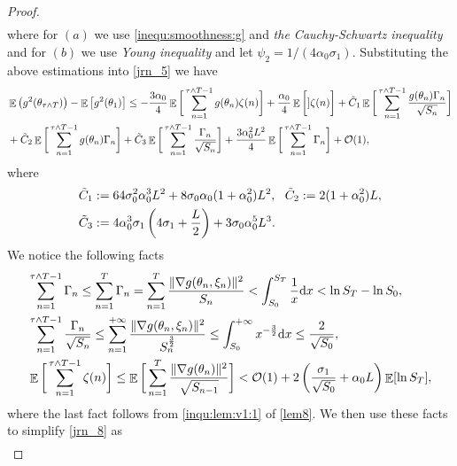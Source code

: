 \documentclass[standalone]{article}
\DeclareMathOperator{\Expect}{\mathbb{E}}
\begin{document}
\begin{proof}
\begin{equation}
\begin{aligned}
\end{aligned}\end{equation}
where for $(a)$ we use \cref{inequ:smoothness:g} and \emph{the Cauchy-Schwartz inequality} and for $(b)$ we use \emph{Young inequality} and let $\psi_2 = 1/(4\alpha_0\sigma_1)$. 
Substituting the above estimations into \cref{jrn_5} we have
\begin{align}\label{jrn_8}
&\Expect\big({g^{2}(\theta_{\tau\wedge T})}\big)-\Expect\big[{g^{2}(\theta_{1})}\big]\le- \frac{3\alpha_{0}}{4}\Expect\bigg[\sum_{n=1}^{\tau\wedge T-1}  g(\theta_{n}) \zeta(n)\bigg] +\frac{\alpha_{0}}{4}\Expect\bigg[] \zeta(n)\bigg] + \tilde{C}_1\Expect\bigg[\sum_{n=1}^{\tau\wedge T-1}\frac{g(\theta_{n})\Gamma_n}{\sqrt{S_{n}}}\bigg] \notag \\& +\tilde{C}_{2}\Expect\bigg[\sum_{n=1}^{\tau\wedge T-1} g(\theta_{n}) \Gamma_n\bigg] 
+\tilde{C}_3\Expect\bigg[\sum_{n=1}^{\tau\wedge T-1}\frac{\Gamma_n}{\sqrt{S_{n}}}\bigg]+\frac{3\alpha_{0}^2 L^2}{4}\Expect\bigg[\sum_{n=1}^{\tau\wedge T-1} \Gamma_n\bigg] + \mathcal{O}(1),
\end{align} where
\begin{align}
\tilde{C}_{1}&:=64\sigma_0^2\alpha_0^3 L^2 + 8\sigma_0\alpha_0(1+\alpha_0^2) L^2,\ \ \tilde{C}_{2}:= 2(1+\alpha_0^2) L,  \notag \\
\tilde{C}_{3} & :=4\alpha_0^3\sigma_1\left(4\sigma_1+\frac{ L}{2}\right)+3\sigma_0\alpha_{0}^{5} L^3. \notag 
\end{align}
We notice the following facts
\begin{align} 
&\sum_{n=1}^{\tau\wedge T-1} \Gamma_n \leq \sum_{n=1}^{T}\Gamma_n = \sum_{n=1}^{T}\frac{\|\nabla g(\theta_{n},\xi_{n})\|^{2}}{S_{n}}<\int_{S_{0}}^{S_{T}}\frac{1}{x}\text{d}x<\ln S_{T}-\ln S_{0}, \notag \\&
\sum_{n=1}^{\tau\wedge T-1}\frac{\Gamma_n}{\sqrt{S_n}}\le \sum_{n=1}^{+\infty}\frac{\|\nabla g(\theta_{n},\xi_{n})\|^{2}}{S_{n}^{\frac{3}{2}}}\le \int_{S_{0}}^{+\infty}x^{-\frac{3}{2}}\text{d}x\le \frac{2}{\sqrt{S_0}}, \notag \\& 
\Expect\bigg[\sum_{n=1}^{\tau\wedge T-1} \zeta(n)\bigg]\le \Expect\bigg[\sum_{n=1}^{T}\frac{\|\nabla g(\theta_{n})\|^{2}}{\sqrt{S_{n-1}}}\bigg]< \mathcal{O}(1)+ 2\left(\frac{\sigma_1}{\sqrt{S_0}} + \alpha_0 L\right)\Expect[\ln S_{T}],  \notag 
\end{align} 
where the last fact follows from \cref{inqu:lem:v1:1} of \cref{lem8}.
We then use these facts to simplify  \cref{jrn_8} as
\begin{align}\label{inequ:lem:v2:1}

\end{align}
\end{proof}
\end{document}
